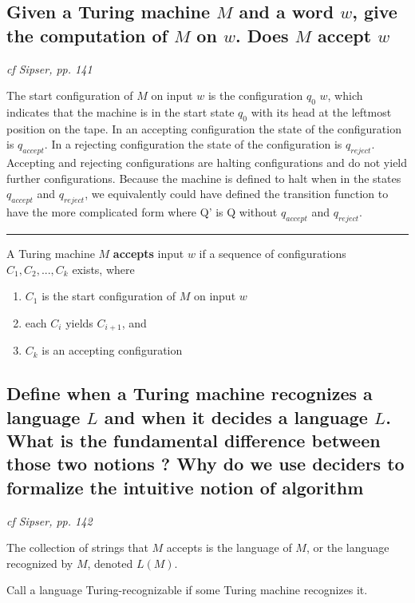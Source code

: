 \documentclass[main.tex]{subfiles}
\begin{document}
\subsection{Given a Turing machine $M$ and a word $w$, give the computation of $M$ on $w$. Does $M$ accept $w$}
\emph{cf Sipser, pp. 141}


The start configuration of $M$  on input $w$ is the configuration $q_0$ $w$, which
indicates that the machine is in the start state $q_0$ with its head at the leftmost
position on the tape. In an accepting configuration the state of the configuration
is $q_{accept}$. In a rejecting configuration the state of the configuration is $q_{reject}$.
Accepting and rejecting configurations are halting configurations and do not
yield further configurations. Because the machine is defined to halt when in the
states $q_{accept}$ and $q_{reject}$, we equivalently could have defined the transition function to have the more complicated form 
where Q’ is Q
without $q_{accept}$ and $q_{reject}$.
\begin{center}
    \rule{0.3\textwidth}{0.4pt}
\end{center}
\par A Turing machine $M$ \textbf{accepts} input $w$ if a sequence of configurations $C_{1},C_{2}, ..., C_{k}$ exists, where
\begin{enumerate}[label=\textbf{\arabic*}]
    \item $C_{1}$ is the start configuration of $M$ on input $w$
    \item each $C_{i}$ yields $C_{i+1}$, and
    \item $C_{k}$ is an accepting configuration
\end{enumerate}
 
\subsection{Define when a Turing machine recognizes a language $L$ and when it decides a language $L$. What is the fundamental difference between those two notions ? Why do we use deciders to formalize the intuitive notion of algorithm}
\emph{cf Sipser, pp. 142}

The collection of strings that $M$ accepts is the language of $M$, or the language recognized by $M$, denoted $L(M)$. 
\begin{mytheo*}{}
Call a language Turing-recognizable if some Turing machine
recognizes it.
\end{mytheo*}
\end{document}
